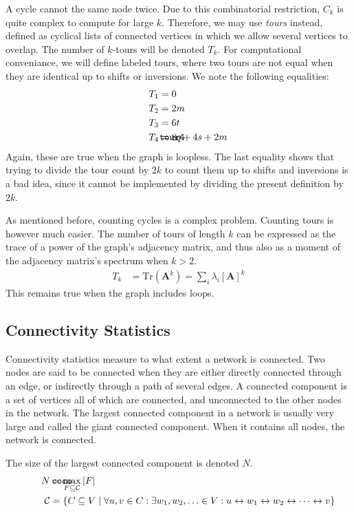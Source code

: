 \documentclass{article}
\def\mathnote#1{%
  \tag*{\rlap{\hspace\marginparsep\smash{\parbox[t]{\marginparwidth}{#1}}}}
}
\begin{document}
A cycle cannot the same node twice.  Due to this combinatorial
restriction, $C_k$ is quite complex to compute for large $k$.
Therefore, we may use \emph{tours} instead, defined as cyclical lists of
connected vertices in which we allow several vertices to overlap.  The
number of $k$-tours will be denoted $T_k$.  For computational
conveniance, we will define labeled tours, where two tours are not equal
when they are identical up to shifts or inversions.  
We note the following equalities: 
\begin{align}
  T_1 &= 0 \nonumber \\
  T_2 &= 2m \nonumber \\
  T_3 &= 6t \nonumber \\
  \mathnote{\texttt{tour4}}
  T_4 &= 8q + 4s + 2m 
\end{align}
Again, these are true when the graph is loopless.  The last equality
shows that trying to divide the tour count by $2k$ to count them up to
shifts and inversions is a bad idea, since it cannot be implemented by
dividing the present definition by $2k$. 

As mentioned before, counting cycles is a complex problem.  Counting
tours is however much easier.  The number of tours of length $k$ can be
expressed as the trace of a power of the graph's adjacency matrix, and
thus also as a moment of the adjacency matrix's spectrum when $k > 2$.  
\begin{align}
  T_k &= \mathrm{Tr}(\mathbf A^k) = \sum_i \lambda_i[\mathbf A]^k
\end{align}
This remains true when the graph includes loops.  

\subsection{Connectivity Statistics}
Connectivity statistics measure to what extent a network is
connected. 
Two nodes are said to be connected when they are either directly
connected through an edge, or indirectly through a path of several
edges. 
A connected component is a set of vertices all of which are connected,
and unconnected to the other nodes in the network.  
The largest connected component in a network is usually very large and
called the giant connected component. When it contains all nodes, the
network is connected. 

The size of the largest connected component is denoted 
$N$.  
\begin{align}
  \mathnote{\texttt{coco}}
  N &= \max_{F \subseteq \mathcal C} |F|  \\
  \mathcal C &= \{ C \subseteq V \mid \forall u, v \in C:  \exists w_1,
  w_2, \ldots \in V:  u \leftrightarrow w_1 \leftrightarrow w_2 \leftrightarrow \cdots \leftrightarrow v \} \nonumber
\end{align}
\end{document}
